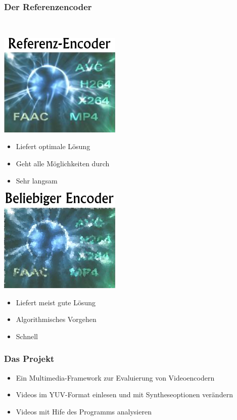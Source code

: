 \documentclass[t]{beamer}
\begin{document}
\begin{frame}
	\frametitle{Der Referenzencoder}
	~\\
	\begin{minipage}{5.3cm}
		\includegraphics[scale=.5]{ref.png}
		~\\
		\begin{itemize}
			\item<2-> Liefert optimale Lösung
			\item<4-> Geht alle Möglichkeiten durch
			\item<5-> Sehr langsam
		\end{itemize}
	\end{minipage}
	\hfill	
	\begin{minipage}{4.7cm}
		\includegraphics[scale=.5]{beliebig.png}
		~\\
		\begin{itemize}
			\item<3-> Liefert meist gute Lösung
			\item<6-> Algorithmisches Vorgehen
			\item<7-> Schnell
			
		\end{itemize}
	\end{minipage}
\end{frame}

\begin{frame}
	\frametitle{Das Projekt}
	
	\begin{itemize}
		\item<+-> Ein Multimedia-Framework zur Evaluierung von Videoencodern
		\item<+-> Videos im YUV-Format einlesen und mit Syntheseoptionen verändern
		\item<+-> Videos mit Hife des Programms analysieren
	\end{itemize}
\end{frame}
\end{document}

